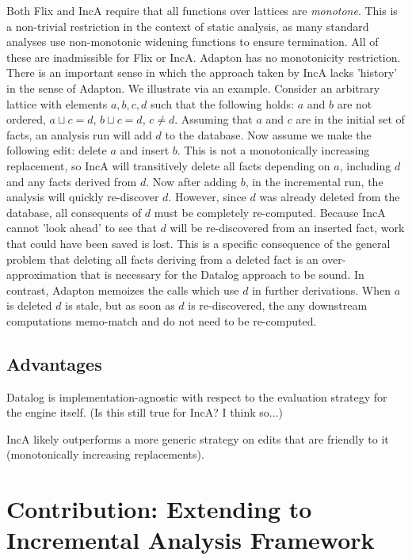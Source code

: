 \documentclass[acmlarge,anonymous]{acmart}\settopmatter{printfolios=true}
\begin{document}
Both Flix and IncA require that all functions over lattices are \textit{monotone}. This is a non-trivial restriction in the context of static analysis, as many standard analyses use non-monotonic widening functions to ensure termination. All of these are inadmissible for Flix or IncA. Adapton has no monotonicity restriction.\\

There is an important sense in which the approach taken by IncA lacks 'history' in the sense of Adapton. We illustrate via an example. Consider an arbitrary lattice with elements $a, b, c, d$ such that the following holds: $a$ and $b$ are not ordered, $a \sqcup c = d$, $b \sqcup c = d$, $c \neq d$. Assuming that $a$ and $c$ are in the initial set of facts, an analysis run will add $d$ to the database. Now assume we make the following edit: delete $a$ and insert $b$. This is not a monotonically increasing replacement, so IncA will transitively delete all facts depending on $a$, including $d$ and any facts derived from $d$. Now after adding $b$, in the incremental run, the analysis will quickly re-discover $d$. However, since $d$ was already deleted from the database, all consequents of $d$ must be completely re-computed. Because IncA cannot 'look ahead' to see that $d$ will be re-discovered from an inserted fact, work that could have been saved is lost. This is a specific consequence of the general problem that deleting all facts deriving from a deleted fact is an over-approximation that is necessary for the Datalog approach to be sound. In contrast, Adapton memoizes the calls which use $d$ in further derivations. When $a$ is deleted $d$ is stale, but as soon as $d$ is re-discovered, the any downstream computations memo-match and do not need to be re-computed.

\subsection{Advantages}

Datalog is implementation-agnostic with respect to the evaluation strategy for the engine itself. (Is this still true for IncA? I think so...)

IncA likely outperforms a more generic strategy on edits that are friendly to it (monotonically increasing replacements).

\section{Contribution: Extending to Incremental Analysis Framework}
\end{document}
